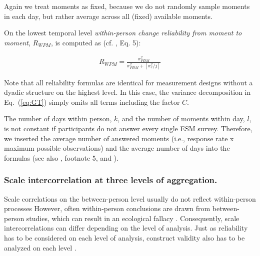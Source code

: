 \documentclass[jou,a4paper,draftfirst]{apa6}\usepackage[]{graphicx}\usepackage[]{color}
\begin{document}
Again we treat moments as fixed, because we do not randomly sample moments in each day, but rather average across all (fixed) available moments.


On the lowest temporal level \emph{within-person change reliability from moment to moment}, $R_{WPM}$, is computed as (cf. , Eq. 5):

\begin{equation}
\label{eq:R_WPM}
\begin{split}
R_{WPM} = \frac{ 
		\sigma^2_{PDM}
	}{ 	
		\sigma^2_{PDM} + [\sigma^2_{e} / j] 
	}
\end{split}
\end{equation}

Note that all reliability formulas are identical for measurement designs without a dyadic structure on the highest level. In this case, the variance decomposition in Eq.~(\ref{eq:GT}) simply omits all terms including the factor $C$.

The number of days within person, $k$, and the number of moments within day, $l$, is not constant if participants do not answer every single ESM survey. Therefore, we inserted the average number of answered moments (i.e., response rate x maximum possible observations) and the average number of days into the formulas (see also , footnote 5, and ).


\subsubsection{Scale intercorrelation at three levels of aggregation.}
Scale correlations on the between-person level usually do not reflect within-person processes \parencite{molenaar_implications_2008} However, often within-person conclusions are drawn from between-person studies, which can result in an ecological fallacy \parencite{adolf_ErgodicitySufficientNot_2019,medaglia_ReplyAdolfFried_2019,fisher_LackGrouptoindividualGeneralizability_2018,kievit_SimpsonParadoxPsychological_2013}. Consequently, scale intercorrelations can differ depending on the level of analysis. Just as reliability has to be considered on each level of analysis, construct validity also has to be analyzed on each level \parencite{shrout_Psychometrics_2012}.
\end{document}
